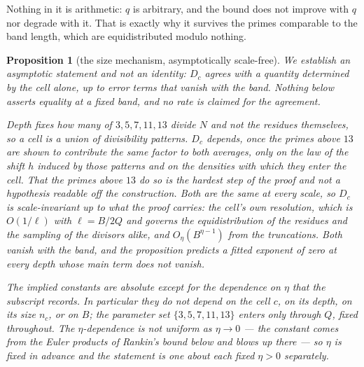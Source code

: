 \documentclass[11pt,a4paper]{article}
\theoremstyle{plain}
\newtheorem{proposition}[theorem]{Proposition}
\theoremstyle{definition}
\theoremstyle{remark}
\begin{document}
Nothing in it is arithmetic: $q$ is arbitrary, and the bound does not
improve with $q$ nor degrade with it. That is exactly why it survives
the primes comparable to the band length, which are equidistributed
modulo nothing.

\begin{proposition}[the size mechanism, asymptotically scale-free]%
\label{prop:scaleinv}
We establish an asymptotic statement and not an identity: $D_c$ agrees
with a quantity determined by the cell alone, up to error terms that
vanish with the band. Nothing below asserts equality at a fixed band,
and no rate is claimed for the agreement.

Depth fixes how many of $3,5,7,11,13$ divide $N$ and not the residues
themselves, so a cell is a union of divisibility patterns. $D_c$
depends, once the primes above $13$ are shown to contribute the same
factor to both averages, only on the law of the shift $h$ induced by
those patterns and on the densities with which they enter the cell.
That the primes above $13$ do so is the hardest step of the proof and
not a hypothesis readable off the construction. Both are the same at
every scale, so $D_c$ is scale-invariant up to what the proof
carries: the cell's own resolution, which is $O(1/\ell)$ with
$\ell=B/2Q$ and governs the equidistribution of the residues and the
sampling of the divisors alike, and $O_\eta(B^{\eta-1})$ from the
truncations. Both vanish with the band, and the proposition predicts
a fitted exponent of zero at every depth whose main term does not
vanish.

The implied constants are absolute except for the dependence on $\eta$
that the subscript records. In particular they do not depend on the
cell $c$, on its depth, on its size $n_c$, or on $B$; the parameter set
$\{3,5,7,11,13\}$ enters only through $Q$, fixed throughout. The
$\eta$-dependence is not uniform as $\eta\to0$ --- the constant comes
from the Euler products of Rankin's bound below and blows up there ---
so $\eta$ is fixed in advance and the statement is one about each fixed
$\eta>0$ separately.
\end{proposition}
\end{document}
